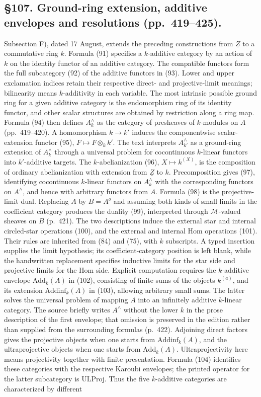 \documentclass[10pt,oneside]{book}
\begin{document}
\subsection*{\S107. Ground-ring extension, additive envelopes and resolutions (pp.\ 419--425).}
Subsection F), dated 17 August, extends the preceding constructions from $\underline Z$ to a commutative ring $k$. Formula (91) specifies a $k$-additive category by an action of $k$ on the identity functor of an additive category. The compatible functors form the full subcategory (92) of the additive functors in (93). Lower and upper exclamation indices retain their respective direct- and projective-limit meanings; bilinearity means $k$-additivity in each variable. The most intrinsic possible ground ring for a given additive category is the endomorphism ring of its identity functor, and other scalar structures are obtained by restriction along a ring map. Formula (94) then defines $A^\wedge_k$ as the category of presheaves of $k$-modules on $A$ (pp.\ 419--420). A homomorphism $k\to k'$ induces the componentwise scalar-extension functor (95), $F\mapsto F\otimes_k k'$. The text interprets $A^\wedge_{k'}$ as a ground-ring extension of $A^\wedge_k$ through a universal problem for cocontinuous $k$-linear functors into $k'$-additive targets. The $k$-abelianization (96), $X\mapsto k^{(X)}$, is the composition of ordinary abelianization with extension from $\underline Z$ to $k$. Precomposition gives (97), identifying cocontinuous $k$-linear functors on $A^\wedge_k$ with the corresponding functors on $A^\wedge$, and hence with arbitrary functors from $A$. Formula (98) is the projective-limit dual. Replacing $A$ by $B=A^o$ and assuming both kinds of small limits in the coefficient category produces the duality (99), interpreted through $\mathcal M$-valued sheaves on $B$ (p.\ 421). The two descriptions induce the external star and internal circled-star operations (100), and the external and internal Hom operations (101). Their rules are inherited from (84) and (75), with $k$ subscripts. A typed insertion supplies the limit hypothesis; its coefficient-category position is left blank, while the handwritten replacement specifies inductive limits for the star side and projective limits for the Hom side. Explicit computation requires the $k$-additive envelope $\mathrm{Add}_k(A)$ in (102), consisting of finite sums of the objects $k^{(a)}$, and its extension $\mathrm{Addinf}_k(A)$ in (103), allowing arbitrary small sums. The latter solves the universal problem of mapping $A$ into an infinitely additive $k$-linear category. The source briefly writes $A^\wedge$ without the lower $k$ in the prose description of the first envelope; that omission is preserved in the edition rather than supplied from the surrounding formulas (p.\ 422). Adjoining direct factors gives the projective objects when one starts from $\mathrm{Addinf}_k(A)$, and the ultraprojective objects when one starts from $\mathrm{Add}_k(A)$. Ultraprojectivity here means projectivity together with finite presentation. Formula (104) identifies these categories with the respective Karoubi envelopes; the printed operator for the latter subcategory is $\mathrm{ULProj}$. Thus the five $k$-additive categories are characterized by different 
\end{document}
